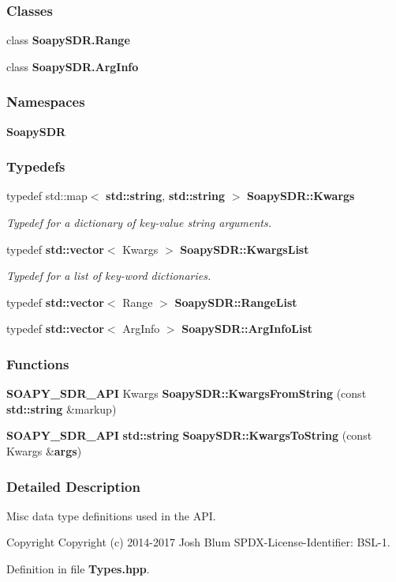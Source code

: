 \subsubsection*{Classes}
\begin{DoxyCompactItemize}
\item 
class {\bf Soapy\+S\+D\+R.\+Range}
\item 
class {\bf Soapy\+S\+D\+R.\+Arg\+Info}
\end{DoxyCompactItemize}
\subsubsection*{Namespaces}
\begin{DoxyCompactItemize}
\item 
 {\bf Soapy\+S\+DR}
\end{DoxyCompactItemize}
\subsubsection*{Typedefs}
\begin{DoxyCompactItemize}
\item 
typedef std\+::map$<$ {\bf std\+::string}, {\bf std\+::string} $>$ {\bf Soapy\+S\+D\+R\+::\+Kwargs}
\begin{DoxyCompactList}\small\item\em Typedef for a dictionary of key-\/value string arguments. \end{DoxyCompactList}\item 
typedef {\bf std\+::vector}$<$ Kwargs $>$ {\bf Soapy\+S\+D\+R\+::\+Kwargs\+List}
\begin{DoxyCompactList}\small\item\em Typedef for a list of key-\/word dictionaries. \end{DoxyCompactList}\item 
typedef {\bf std\+::vector}$<$ Range $>$ {\bf Soapy\+S\+D\+R\+::\+Range\+List}
\item 
typedef {\bf std\+::vector}$<$ Arg\+Info $>$ {\bf Soapy\+S\+D\+R\+::\+Arg\+Info\+List}
\end{DoxyCompactItemize}
\subsubsection*{Functions}
\begin{DoxyCompactItemize}
\item 
{\bf S\+O\+A\+P\+Y\+\_\+\+S\+D\+R\+\_\+\+A\+PI} Kwargs {\bf Soapy\+S\+D\+R\+::\+Kwargs\+From\+String} (const {\bf std\+::string} \&markup)
\item 
{\bf S\+O\+A\+P\+Y\+\_\+\+S\+D\+R\+\_\+\+A\+PI} {\bf std\+::string} {\bf Soapy\+S\+D\+R\+::\+Kwargs\+To\+String} (const Kwargs \&{\bf args})
\end{DoxyCompactItemize}


\subsubsection{Detailed Description}
Misc data type definitions used in the A\+PI. 

\begin{DoxyCopyright}{Copyright}
Copyright (c) 2014-\/2017 Josh Blum S\+P\+D\+X-\/\+License-\/\+Identifier\+: B\+S\+L-\/1. 
\end{DoxyCopyright}


Definition in file {\bf Types.\+hpp}.

